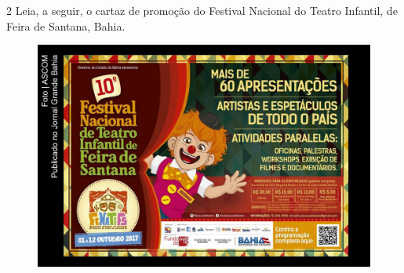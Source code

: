 \num{2} Leia, a seguir, o cartaz de promoção do Festival Nacional do Teatro
Infantil, de Feira de Santana, Bahia.

\begin{figure}[htpb!]
\includegraphics[width=\textwidth]{media/image15.jpeg}
\end{figure}

